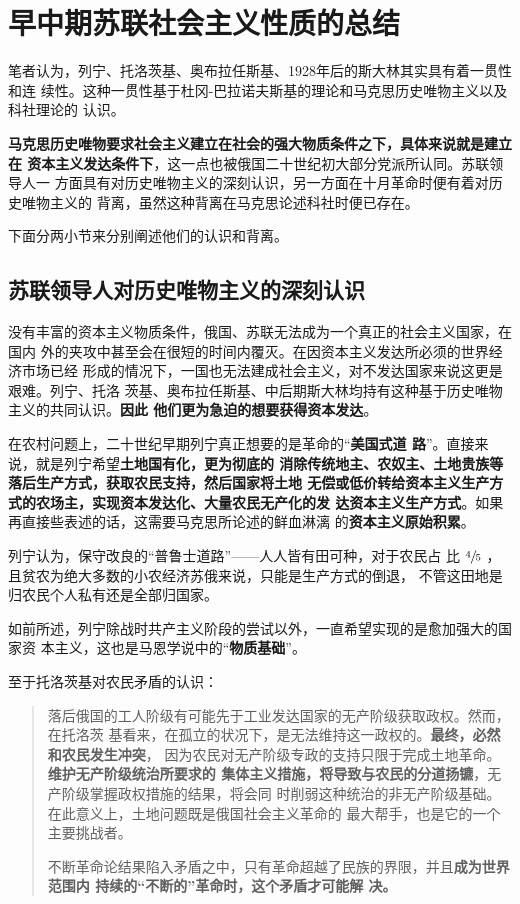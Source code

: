 \section{早中期苏联社会主义性质的总结}

笔者认为，列宁、托洛茨基、奥布拉任斯基、1928年后的斯大林其实具有着一贯性和连
续性。这种一贯性基于杜冈-巴拉诺夫斯基的理论和马克思历史唯物主义以及科社理论的
认识。

\textbf{马克思历史唯物要求社会主义建立在社会的强大物质条件之下，具体来说就是建立在
  资本主义发达条件下}，这一点也被俄国二十世纪初大部分党派所认同。苏联领导人一
方面具有对历史唯物主义的深刻认识，另一方面在十月革命时便有着对历史唯物主义的
背离，虽然这种背离在马克思论述科社时便已存在。

下面分两小节来分别阐述他们的认识和背离。

\subsection{苏联领导人对历史唯物主义的深刻认识}

没有丰富的资本主义物质条件，俄国、苏联无法成为一个真正的社会主义国家，在国内
外的夹攻中甚至会在很短的时间内覆灭。在因资本主义发达所必须的世界经济市场已经
形成的情况下，一国也无法建成社会主义，对不发达国家来说这更是艰难。列宁、托洛
茨基、奥布拉任斯基、中后期斯大林均持有这种基于历史唯物主义的共同认识。\textbf{因此
  他们更为急迫的想要获得资本发达}。

在农村问题上，二十世纪早期列宁真正想要的是革命的“\textbf{美国式道
  路}”\cite{chenxintianamerica}。直接来说，就是列宁希望\textbf{土地国有化，更为彻底的
  消除传统地主、农奴主、土地贵族等落后生产方式，获取农民支持，然后国家将土地
  无偿或低价转给资本主义生产方式的农场主，实现资本发达化、大量农民无产化的发
  达资本主义生产方式}。如果再直接些表述的话，这需要马克思所论述的鲜血淋漓
的\textbf{资本主义原始积累}。

列宁认为，保守改良的“普鲁士道路”——人人皆有田可种，对于农民占
比 $\sfrac{4}{5}$ ，且贫农为绝大多数的小农经济苏俄来说，只能是生产方式的倒退，
不管这田地是归农民个人私有还是全部归国家。

如前所述，列宁除战时共产主义阶段的尝试以外，一直希望实现的是愈加强大的国家资
本主义，这也是马恩学说中的“\textbf{物质基础}”。

至于托洛茨基对农民矛盾的认识：
\begin{quotation}
  落后俄国的工人阶级有可能先于工业发达国家的无产阶级获取政权。然而，在托洛茨
  基看来，在孤立的状况下，是无法维持这一政权的。\textbf{最终，必然和农民发生冲突}，
  因为农民对无产阶级专政的支持只限于完成土地革命。\textbf{维护无产阶级统治所要求的
    集体主义措施，将导致与农民的分道扬镳}，无产阶级掌握政权措施的结果，将会同
  时削弱这种统治的非无产阶级基础。在此意义上，土地问题既是俄国社会主义革命的
  最大帮手，也是它的一个主要挑战者。

  不断革命论结果陷入矛盾之中，只有革命超越了民族的界限，并且\textbf{成为世界范围内
    持续的“不断的”革命时，这个矛盾才可能解
    决。}
\end{quotation}


